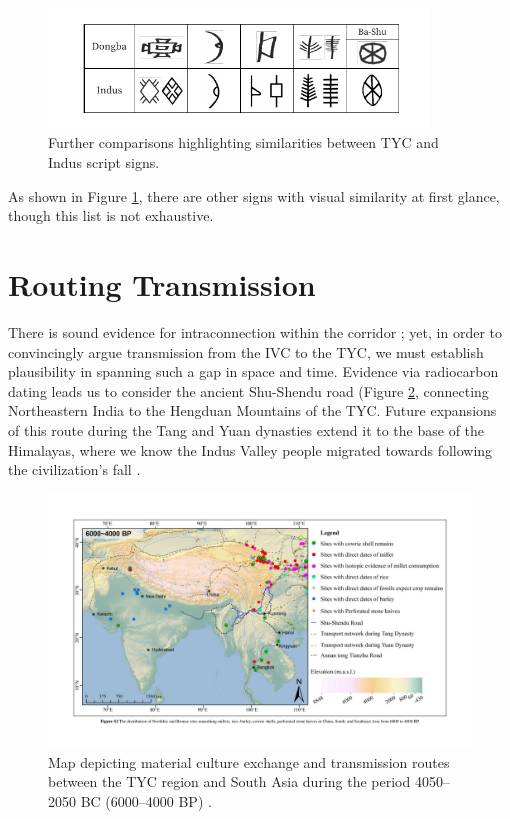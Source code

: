 \documentclass[11pt,a4paper,oneside]{report}
\begin{document}
\begin{figure}[H] 
    \centering
    \includegraphics[width=0.9\textwidth]{Visualizations/Figures/Similarities.pdf}
    \caption[Additional IVC-TYC Sign Comparison Chart]{Further comparisons highlighting similarities between TYC and Indus script signs.}
    \label{fig:sim}
\end{figure}

As shown in Figure \ref{fig:sim}, there are other signs with visual similarity at first glance, though this list is not exhaustive.


\section{Routing Transmission}
\noindent\hspace{1cm}
There is sound evidence for intraconnection within the corridor \cite{yao_genetic_2017, shi_ethnic_2018}; yet, in order to convincingly argue transmission from the IVC to the TYC, we must establish plausibility in spanning such a gap in space and time. Evidence via radiocarbon dating leads us to consider the ancient Shu-Shendu road (Figure \ref{fig:shu-shendu}, connecting Northeastern India to the Hengduan Mountains of the TYC. Future expansions of this route during the Tang and Yuan dynasties extend it to the base of the Himalayas, where we know the Indus Valley people migrated towards following the civilization's fall \cite{khan_bricks_2013, law_building_2007}.  

\begin{figure}[H] 
    \centering
    \includegraphics[width=1\textwidth]{Images/Shu-Shendu.pdf}
    \caption[Shu-Shendu Road Contextual Map]{Map depicting material culture exchange and transmission routes between the TYC region and South Asia during the period 4050–2050 BC (6000–4000 BP) \cite{ma_understanding_2023}.}
    \label{fig:shu-shendu}
\end{figure}
\end{document}
